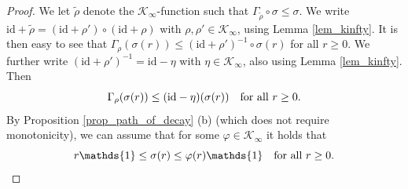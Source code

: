 \documentclass[10pt, oneside, a4paper]{article}
\newcommand{\unit}{\mathds{1}}
\newcommand{\id}{\mathrm{id}}
\newcommand{\KC}{\mathcal{K}}
\begin{document}
\begin{proof}
We let $\tilde{\rho}$ denote the $\KC_{\infty}$-function such that $\Gamma_{\tilde{\rho}} \circ \sigma \leq \sigma$. We write $\id + \tilde{\rho} = (\id + \rho') \circ (\id + \rho)$ with $\rho,\rho' \in \KC_{\infty}$, using Lemma \ref{lem_kinfty}. It is then easy to see that $\Gamma_{\rho}(\sigma(r)) \leq (\id + \rho')^{-1} \circ \sigma(r)$ for all $r \geq 0$. We further write $(\id + \rho')^{-1} = \id - \eta$ with $\eta \in \KC_{\infty}$, also using Lemma \ref{lem_kinfty}. Then%
\begin{equation}\label{eq_decrease_property}
  \Gamma_{\rho}(\sigma(r)) \leq (\id - \eta)(\sigma(r)) \mbox{\quad for all\ } r \geq 0.%
\end{equation}
By Proposition \ref{prop_path_of_decay} (b) (which does not require monotonicity), we can assume that for some $\varphi \in \KC_{\infty}$ it holds that%
\begin{equation}\label{eq_sigma_bounds}
  r\unit \leq \sigma(r) \leq \varphi(r)\unit \mbox{\quad for all\ } r \geq 0.%
\end{equation}


\end{proof}
\end{document}
